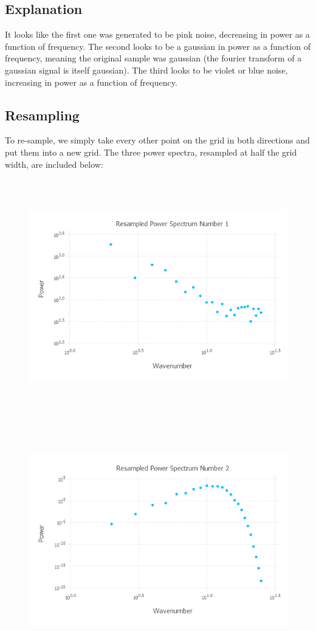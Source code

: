 \documentclass{article}
\begin{document}
\subsection{Explanation}
It looks like the first one was generated to be pink noise, decreasing in power as a function of frequency. The second looks to be a gaussian in power as a function of frequency, meaning the original sample was gaussian (the fourier transform of a gaussian signal is itself gaussian). The third looks to be violet or blue noise, increasing in power as a function of frequency.

\subsection{Resampling}
To re-sample, we simply take every other point on the grid in both directions and put them into a new grid. The three power spectra, resampled at half the grid width, are included below:
\begin{figure}[H]
	\includegraphics[width=6in,height=4in]{"ps21"}
\end{figure}
\begin{figure}[H]
	\includegraphics[width=6in,height=4in]{"ps22"}
\end{figure}
\end{document}
